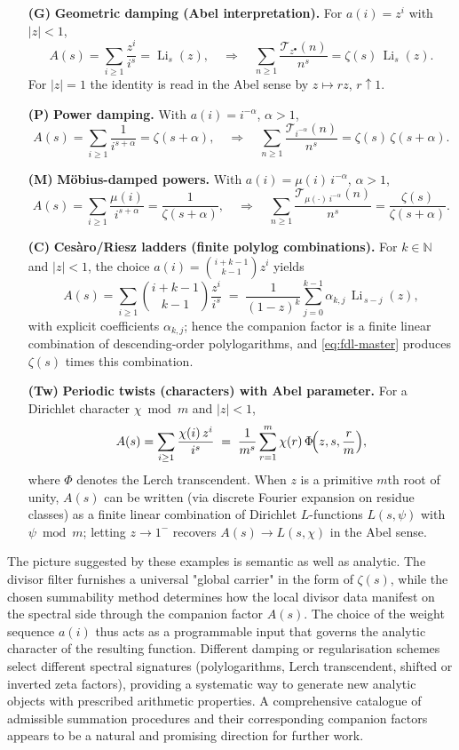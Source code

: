 \documentclass[11pt,a4paper]{amsart}
\theoremstyle{plain}
\theoremstyle{definition}
\theoremstyle{remark}
\begin{document}
\begin{itemize}
  \item[\textbf{(G)}] \textbf{Geometric damping (Abel interpretation).} For $a(i)=z^i$ with $|z|<1$,
  \[
  A(s)=\sum_{i\ge1}\frac{z^i}{i^s}=\operatorname{Li}_s(z),
  \quad\Rightarrow\quad
  \sum_{n\ge1}\frac{\mathcal T_{z^\bullet}(n)}{n^s}=\zeta(s)\,\operatorname{Li}_s(z).
  \]
  For $|z|=1$ the identity is read in the Abel sense by $z\mapsto rz$, $r\uparrow1$.
  \item[\textbf{(P)}] \textbf{Power damping.} With $a(i)=i^{-\alpha}$, $\alpha>1$,
  \[
  A(s)=\sum_{i\ge1}\frac{1}{i^{s+\alpha}}=\zeta(s+\alpha),
  \quad\Rightarrow\quad
  \sum_{n\ge1}\frac{\mathcal T_{i^{-\alpha}}(n)}{n^s}=\zeta(s)\,\zeta(s+\alpha).
  \]
  \item[\textbf{(M)}] \textbf{M\"obius-damped powers.} With $a(i)=\mu(i)\,i^{-\alpha}$, $\alpha>1$,
  \[
  A(s)=\sum_{i\ge1}\frac{\mu(i)}{i^{s+\alpha}}=\frac{1}{\zeta(s+\alpha)},
  \quad\Rightarrow\quad
  \sum_{n\ge1}\frac{\mathcal T_{\mu(\cdot)\,i^{-\alpha}}(n)}{n^s}=\frac{\zeta(s)}{\zeta(s+\alpha)}.
  \]
  \item[\textbf{(C)}] \textbf{Ces\`aro/Riesz ladders (finite polylog combinations).}
  For $k\in\mathbb N$ and $|z|<1$, the choice $a(i)=\binom{i+k-1}{k-1}z^i$ yields
  \[
  A(s)=\sum_{i\ge1}\binom{i+k-1}{k-1}\frac{z^i}{i^s}
  \;=\;\frac{1}{(1-z)^k}\sum_{j=0}^{k-1}\alpha_{k,j}\,\operatorname{Li}_{\,s-j}(z),
  \]
  with explicit coefficients $\alpha_{k,j}$; hence the companion factor is a finite linear combination of descending-order polylogarithms, and \eqref{eq:fdl-master} produces $\zeta(s)$ times this combination.
  \item[\textbf{(Tw)}] \textbf{Periodic twists (characters) with Abel parameter.}
  For a Dirichlet character $\chi\bmod m$ and $|z|<1$,
  \[
  A(s)=\sum_{i\ge1}\frac{\chi(i)\,z^i}{i^s}
  \;=\;\frac{1}{m^s}\sum_{r=1}^{m}\chi(r)\,\Phi\!\Bigl(z,s,\frac{r}{m}\Bigr),
  \]
  where $\Phi$ denotes the Lerch transcendent. When $z$ is a primitive $m$th root of unity, $A(s)$ can be written (via discrete Fourier expansion on residue classes) as a finite linear combination of Dirichlet $L$-functions $L(s,\psi)$ with $\psi\bmod m$; letting $z\to1^{-}$ recovers $A(s)\to L(s,\chi)$ in the Abel sense.
\end{itemize}

\noindent The picture suggested by these examples is semantic as well as analytic. The divisor filter furnishes a universal "global carrier" in the form of $\zeta(s)$, while the chosen summability method determines how the local divisor data manifest on the spectral side through the companion factor $A(s)$. The choice of the weight sequence $a(i)$ thus acts as a programmable input that governs the analytic character of the resulting function. Different damping or regularisation schemes select different spectral signatures (polylogarithms, Lerch transcendent, shifted or inverted zeta factors), providing a systematic way to generate new analytic objects with prescribed arithmetic properties. A comprehensive catalogue of admissible summation procedures and their corresponding companion factors appears to be a natural and promising direction for further work.
\end{document}
